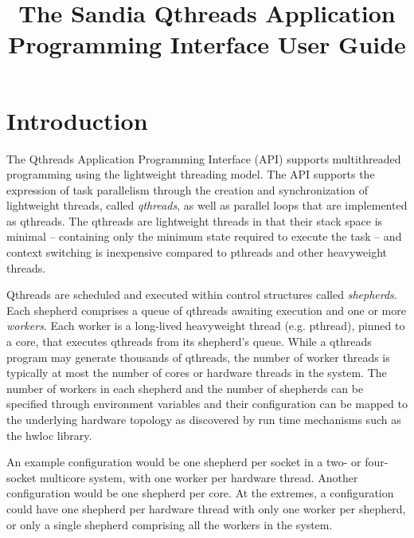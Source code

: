 \documentclass[12pt,fullpage]{article}
\title{The Sandia Qthreads Application Programming Interface User Guide}
\begin{document}
\lstset{language=C,basicstyle=\ttfamily\footnotesize,frame=single}
\maketitle

\section{Introduction}
The Qthreads Application Programming Interface (API) supports multithreaded programming using the lightweight threading model.  The API supports the expression of task parallelism through the creation and synchronization of lightweight threads, called {\it qthreads}, as well as parallel loops that are implemented as qthreads.  The qthreads are lightweight threads in that their stack space is minimal -- containing only the minimum state required to execute the task -- and context switching is inexpensive compared to pthreads and other heavyweight threads.

Qthreads are scheduled and executed within control structures called {\it shepherds}.  Each shepherd comprises a queue of qthreads awaiting execution and one or more {\it workers}.  Each worker is a long-lived heavyweight thread (e.g. pthread), pinned to a core, that executes qthreads from its shepherd's queue.  While a qthreads program may generate thousands of qthreads, the number of worker threads is typically at most the number of cores or hardware threads in the system.  The number of workers in each shepherd and the number of shepherds can be specified through environment variables and their configuration can be mapped to the underlying hardware topology as discovered by run time mechanisms such as the hwloc library.  

An example configuration would be one shepherd per socket in a two- or four-socket multicore system, with one worker per hardware thread.  Another configuration would be one shepherd per core.  At the extremes, a configuration could have one shepherd per hardware thread with only one worker per shepherd, or only a single shepherd comprising all the workers in the system.

\newpage
\end{document}
